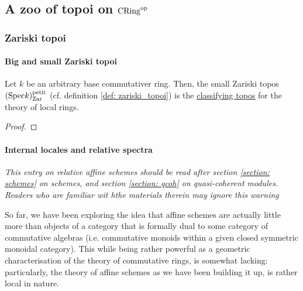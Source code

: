         \subsection{A zoo of topoi on \texorpdfstring{$\mathrm{CRing}^{\mathrm{op}}$}{}}
            \subsubsection{Zariski topoi} 
                \paragraph{Big and small Zariski topoi}
                    \begin{theorem}
                        Let $k$ be an arbitrary base commutativer ring. Then, the small Zariski topos $(\mathrm{Spec} k)^{\mathrm{petit}}_{\mathrm{Zar}}$ (cf. definition \ref{def: zariski_topoi}) is the \href{https://ncatlab.org/nlab/show/classifying+topos}{\underline{classifying topos}} for the theory of local rings.
                    \end{theorem}
                        \begin{proof}
                            
                        \end{proof}
                    
                    \paragraph{Internal locales and relative spectra}  
                    \textit{This entry on relative affine schemes should be read after section \ref{section: schemes} on schemes, and section \ref{section: qcoh} on quasi-coherent modules. Readers who are familiar wit hthe materials therein may ignore this warning}
                    
                    So far, we have been exploring the idea that affine schemes are actually little more than objects of a category that is formally dual to some category of commutative algebras (i.e. commutative monoids within a given closed symmetric monoidal category). This while being rather powerful as a geometric characterisation of the theory of commutative rings, is somewhat lacking: particularly, the theory of affine schemes as we have been building it up, is rather local in nature. 
                    
